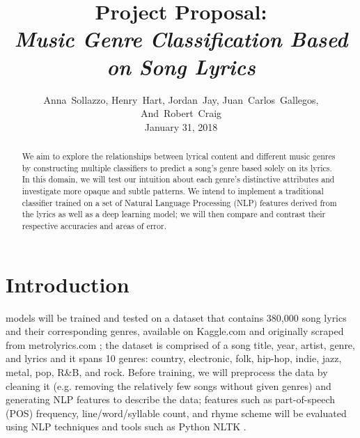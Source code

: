 \documentclass[journal]{IEEEtran}
\begin{document}
\title{Project Proposal:\\\emph{Music Genre Classification Based on Song Lyrics}}

\author{Anna~Sollazzo,
        Henry~Hart,
        Jordan~Jay,
        Juan~Carlos~Gallegos,
        And~Robert~Craig \\ January 31, 2018}
        
\maketitle


\begin{abstract}

    We aim to explore the relationships between lyrical content and different music genres by constructing multiple classifiers to predict a song's genre based solely on its lyrics. In this domain, we will test our intuition about each genre's distinctive attributes and investigate more opaque and subtle patterns. We intend to implement a traditional classifier trained on a set of Natural Language Processing (NLP) features derived from the lyrics as well as a deep learning model; we will then compare and contrast their respective accuracies and areas of error.\par

\end{abstract}

\section{Introduction}

     models will be trained and tested on a dataset that contains 380,000 song lyrics and their corresponding genres, available on Kaggle.com and originally scraped from metrolyrics.com \cite{KaggleDataset}; the dataset is comprised of a song title, year, artist, genre, and lyrics and it spans 10 genres: country, electronic, folk, hip-hop, indie, jazz, metal, pop, R\&B, and rock. Before training, we will preprocess the data by cleaning it (e.g. removing the relatively few songs without given genres) and generating NLP features to describe the data; features such as part-of-speech (POS) frequency, line/word/syllable count, and rhyme scheme will be evaluated using NLP techniques and tools such as Python NLTK \cite{NLTK}.\par
\end{document}
